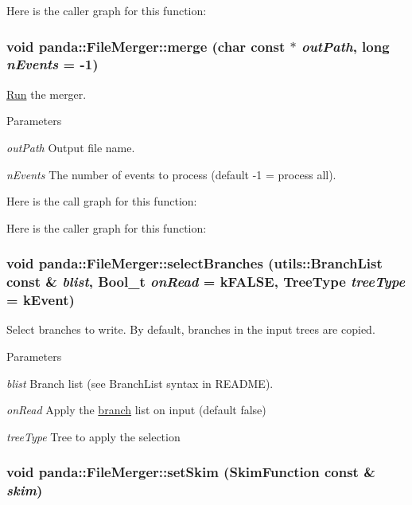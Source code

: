 Here is the caller graph for this function:\hypertarget{classpanda_1_1FileMerger_a13a672d0fef3317ce4335d6a56f4229b}{
\subsubsection[{merge}]{\setlength{\rightskip}{0pt plus 5cm}void panda::FileMerger::merge (char const $\ast$ {\em outPath}, \/  long {\em nEvents} = {\ttfamily -\/1})}}
\label{classpanda_1_1FileMerger_a13a672d0fef3317ce4335d6a56f4229b}


\hyperlink{classpanda_1_1Run}{Run} the merger. 
\begin{DoxyParams}{Parameters}
\item[{\em outPath}]Output file name. \item[{\em nEvents}]The number of events to process (default -\/1 = process all). \end{DoxyParams}


Here is the call graph for this function:

Here is the caller graph for this function:\hypertarget{classpanda_1_1FileMerger_aea8571331c878e0176729c8851ac0861}{
\subsubsection[{selectBranches}]{\setlength{\rightskip}{0pt plus 5cm}void panda::FileMerger::selectBranches ({\bf utils::BranchList} const \& {\em blist}, \/  Bool\_\-t {\em onRead} = {\ttfamily kFALSE}, \/  {\bf TreeType} {\em treeType} = {\ttfamily kEvent})}}
\label{classpanda_1_1FileMerger_aea8571331c878e0176729c8851ac0861}


Select branches to write. By default, branches in the input trees are copied.


\begin{DoxyParams}{Parameters}
\item[{\em blist}]Branch list (see BranchList syntax in README). \item[{\em onRead}]Apply the \hyperlink{namespacepanda_1_1branch}{branch} list on input (default false) \item[{\em treeType}]Tree to apply the selection \end{DoxyParams}
\hypertarget{classpanda_1_1FileMerger_aabc6f2a72d1d6fd2496d69b70bc16aef}{
\subsubsection[{setSkim}]{\setlength{\rightskip}{0pt plus 5cm}void panda::FileMerger::setSkim ({\bf SkimFunction} const \& {\em skim})}}
\label{classpanda_1_1FileMerger_aabc6f2a72d1d6fd2496d69b70bc16aef}


